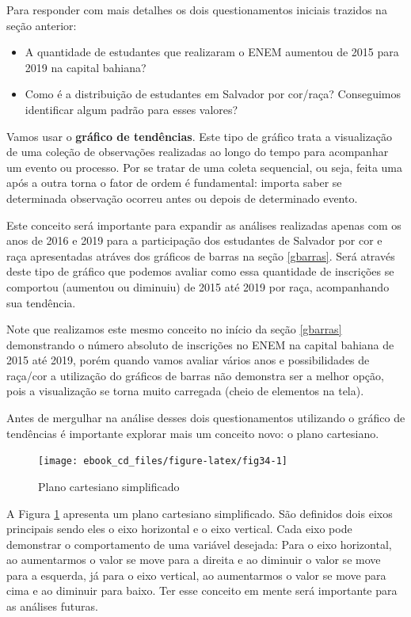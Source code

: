 \documentclass[
  portuguese,
  oneside]{book}
\begin{document}
Para responder com mais detalhes os dois questionamentos iniciais trazidos na seção anterior:

\begin{itemize}
\item
  A quantidade de estudantes que realizaram o ENEM aumentou de 2015 para 2019 na capital bahiana?
\item
  Como é a distribuição de estudantes em Salvador por cor/raça? Conseguimos identificar algum padrão para esses valores?
\end{itemize}

Vamos usar o \textbf{gráfico de tendências}. Este tipo de gráfico trata a visualização de uma coleção de observações realizadas ao longo do tempo para acompanhar um evento ou processo. Por se tratar de uma coleta sequencial, ou seja, feita uma após a outra torna o fator de ordem é fundamental: importa saber se determinada observação ocorreu antes ou depois de determinado evento.

Este conceito será importante para expandir as análises realizadas apenas com os anos de 2016 e 2019 para a participação dos estudantes de Salvador por cor e raça apresentadas atráves dos gráficos de barras na seção \ref{gbarras}. Será através deste tipo de gráfico que podemos avaliar como essa quantidade de inscrições se comportou (aumentou ou diminuiu) de 2015 até 2019 por raça, acompanhando sua tendência.

Note que realizamos este mesmo conceito no início da seção \ref{gbarras} demonstrando o número absoluto de inscrições no ENEM na capital bahiana de 2015 até 2019, porém quando vamos avaliar vários anos e possibilidades de raça/cor a utilização do gráficos de barras não demonstra ser a melhor opção, pois a visualização se torna muito carregada (cheio de elementos na tela).

Antes de mergulhar na análise desses dois questionamentos utilizando o gráfico de tendências é importante explorar mais um conceito novo: o plano cartesiano.

\begin{figure}

{\centering \texttt{[image: ebook\_cd\_files/figure-latex/fig34-1]} 

}

\caption{Plano cartesiano simplificado}\label{fig:fig34}
\end{figure}

A Figura \ref{fig:fig34} apresenta um plano cartesiano simplificado. São definidos dois eixos principais sendo eles o eixo horizontal e o eixo vertical. Cada eixo pode demonstrar o comportamento de uma variável desejada: Para o eixo horizontal, ao aumentarmos o valor se move para a direita e ao diminuir o valor se move para a esquerda, já para o eixo vertical, ao aumentarmos o valor se move para cima e ao diminuir para baixo. Ter esse conceito em mente será importante para as análises futuras.
\end{document}
